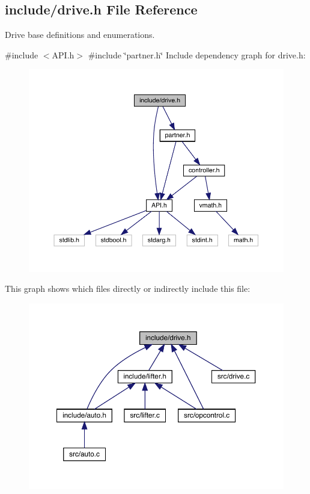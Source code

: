 \subsection{include/drive.h File Reference}
\label{drive_8h}


Drive base definitions and enumerations.  


{\ttfamily \#include $<$A\+P\+I.\+h$>$}\newline
{\ttfamily \#include \char`\"{}partner.\+h\char`\"{}}\newline
Include dependency graph for drive.\+h\+:\nopagebreak
\begin{figure}[H]
\begin{center}
\leavevmode
\includegraphics[width=350pt]{drive_8h__incl}
\end{center}
\end{figure}
This graph shows which files directly or indirectly include this file\+:\nopagebreak
\begin{figure}[H]
\begin{center}
\leavevmode
\includegraphics[width=350pt]{drive_8h__dep__incl}
\end{center}
\end{figure}
